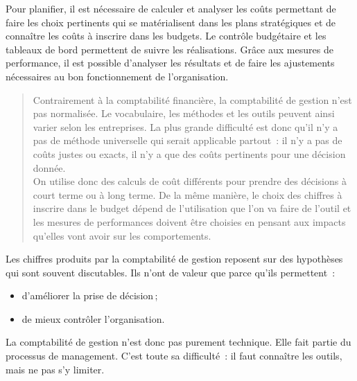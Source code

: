 \documentclass{tufte-handout}
\begin{document}
Pour planifier, il est nécessaire de calculer et analyser les coûts permettant de faire les choix pertinents qui se matérialisent dans les plans stratégiques et de connaître les coûts à inscrire dans les budgets. Le contrôle budgétaire et les tableaux de bord permettent de suivre les réalisations. Grâce aux mesures de performance, il est possible d'analyser les résultats et de faire les ajustements nécessaires au bon fonctionnement de l'organisation.\\

\begin{quote}
Contrairement à la comptabilité financière, la comptabilité de gestion n'est pas normalisée. Le vocabulaire, les méthodes et les outils peuvent ainsi varier selon les entreprises. La plus grande difficulté est donc qu'il n'y a pas de méthode universelle qui serait applicable partout : il n'y a pas de coûts justes ou exacts, il n'y a que des coûts pertinents pour une décision donnée.\\
On utilise donc des calculs de coût différents pour prendre des décisions à court terme ou à long terme. De la même manière, le choix des chiffres à inscrire dans le budget dépend de l'utilisation que l'on va faire de l'outil et les mesures de performances doivent être choisies en pensant aux impacts qu'elles vont avoir sur les comportements.\\
\end{quote}

Les chiffres produits par la comptabilité de gestion reposent sur des hypothèses qui sont souvent discutables. Ils n'ont de valeur que parce qu'ils permettent :\\
\begin{itemize}
\item d'améliorer la prise de décision ;\\
\item de mieux contrôler l'organisation.\\
\end{itemize}

La comptabilité de gestion n'est donc pas purement technique. Elle fait partie du processus de management. C'est toute sa difficulté : il faut connaître les outils, mais ne pas s'y limiter.\\
\end{document}
